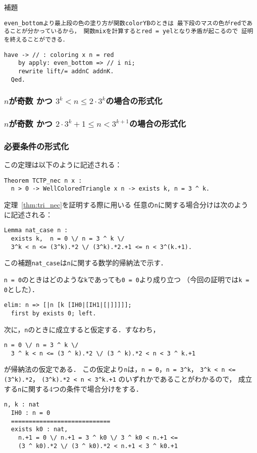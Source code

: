 補題{\tt{even\_bottom}より最上段の色の塗り方が関数{\tt{colorYB}}のときは
最下段のマスの色が{\tt{red}}であることが分かっているから，
関数{\tt{mix}}を計算すると{\tt{red = yel}}となり矛盾が起こるので
証明を終えることができる．
\begin{lstlisting}[language=Coq]
    have -> // : coloring x n = red
    by apply: even_bottom => // i ni;
    rewrite lift/= addnC addnK.
  Qed.
\end{lstlisting}




\subsubsection{$n$が奇数 かつ $3^{k} < n \leq 2 \cdot 3^{k}$の場合の形式化}

\subsubsection{$n$が奇数 かつ $2 \cdot 3^{k} + 1 \leq n < 3^{k+1}$の場合の形式化}

\subsubsection{必要条件の形式化}

この定理は以下のように記述される：
\begin{lstlisting}[language=Coq]
  Theorem TCTP_nec n x :
  n > 0 -> WellColoredTriangle x n -> exists k, n = 3 ^ k.
\end{lstlisting}

定理~\ref{thm:tri_nec}を証明する際に用いる
任意の{\tt{n}}に関する場合分けは次のように記述される：
\begin{lstlisting}[language=Coq]
  Lemma nat_case n :
  exists k,  n = 0 \/ n = 3 ^ k \/
  3^k < n <= (3^k).*2 \/ (3^k).*2.+1 <= n < 3^(k.+1).
\end{lstlisting}
この補題{\tt{nat\_case}}は{\tt{n}}に関する数学的帰納法で示す．

{\tt{n = 0}}のときはどのような{\tt{k}}であっても{\tt{0 = 0}}より成り立つ
（今回の証明では{\tt{k = 0}}とした）．
\begin{lstlisting}[language=Coq]
  elim: n => [|n [k [IH0|[IH1|[|]]]]];
  first by exists 0; left.
\end{lstlisting}
次に，{\tt{n}}のときに成立すると仮定する．すなわち，
\begin{lstlisting}[language=Coq]
  n = 0 \/ n = 3 ^ k \/
  3 ^ k < n <= (3 ^ k).*2 \/ (3 ^ k).*2 < n < 3 ^ k.+1
\end{lstlisting}
が帰納法の仮定である．
この仮定より{\tt{n}}は，{\tt{n = 0}}，{\tt{n = 3\verb|^|k}}，
{\tt{3\verb|^|k < n <= (3\verb|^|k).*2}}，
{\tt{(3\verb|^|k).*2 < n < 3\verb|^|k.+1}}
のいずれかであることがわかるので，
成立する{\tt{n}}に関する4つの条件で場合分けをする．
\begin{lstlisting}[language=Coq]
    n, k : nat
  IH0 : n = 0
  ============================
  exists k0 : nat,
    n.+1 = 0 \/ n.+1 = 3 ^ k0 \/ 3 ^ k0 < n.+1 <=
    (3 ^ k0).*2 \/ (3 ^ k0).*2 < n.+1 < 3 ^ k0.+1


\end{lstlisting}}

